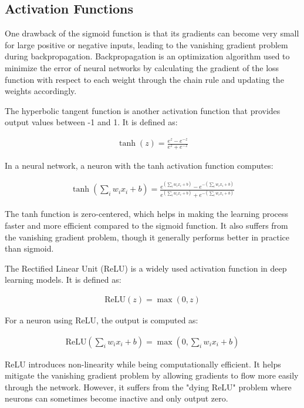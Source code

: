 \subsection{Activation Functions}

One drawback of the sigmoid function is that its gradients can become very small for large positive or negative inputs, leading to the vanishing gradient problem during backpropagation.
Backpropagation is an optimization algorithm used to minimize the error of neural networks by calculating the gradient of the loss function with respect to each weight through the chain rule and updating the weights accordingly.

The hyperbolic tangent function is another activation function that provides output values between -1 and 1.
It is defined as:

\begin{align}
  \tanh(z) = \frac{e^z - e^{-z}}{e^z + e^{-z}}
\end{align}

In a neural network, a neuron with the tanh activation function computes:

\begin{align}
  \tanh(\sum_i w_i x_i + b) = \frac{e^{(\sum_i w_i x_i + b)} - e^{-(\sum_i w_i x_i + b)}}{e^{(\sum_i w_i x_i + b)} + e^{-(\sum_i w_i x_i + b)}}
\end{align}

The tanh function is zero-centered, which helps in making the learning process faster and more efficient compared to the sigmoid function.
It also suffers from the vanishing gradient problem, though it generally performs better in practice than sigmoid.

The Rectified Linear Unit (ReLU) is a widely used activation function in deep learning models.
It is defined as:

\begin{align}
  \text{ReLU}(z) = \max(0, z)
\end{align}

For a neuron using ReLU, the output is computed as:

\begin{align}
  \text{ReLU}(\sum_i w_i x_i + b) = \max(0, \sum_i w_i x_i + b)
\end{align}

ReLU introduces non-linearity while being computationally efficient.
It helps mitigate the vanishing gradient problem by allowing gradients to flow more easily through the network.
However, it suffers from the "dying ReLU" problem where neurons can sometimes become inactive and only output zero.

